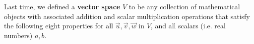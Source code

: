 \begin{applicationActivities}
\begin{remark}
  Last time, we defined a \textbf{vector space} \(V\) to be any collection of
  mathematical objects with
  associated addition and scalar multiplication operations that satisfy
  the following eight properties for all \(\vec u,\vec v,\vec w\) in \(V\),
  and all scalars (i.e. real numbers) \(a,b\).

  \vectorSpaceProperties
\end{remark}

\end{applicationActivities}
